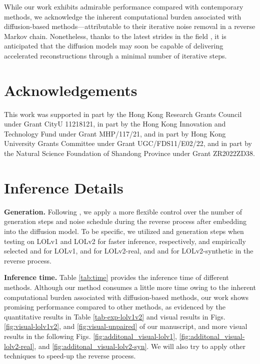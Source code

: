 \documentclass{article}
\begin{document}
While our work exhibits admirable performance compared with contemporary methods, we acknowledge the inherent computational burden associated with diffusion-based methods—attributable to their iterative noise removal in a reverse Markov chain.
Nonetheless, thanks to the latest strides in the field \cite{salimans2022progressive,song2023consistency}, it is anticipated that the diffusion models may soon be capable of delivering accelerated reconstructions through a minimal number of iterative steps.





\section*{Acknowledgements}
This work was supported in part by the Hong Kong Research Grants Council under Grant CityU 11218121, in part by the Hong Kong Innovation and Technology Fund under Grant MHP/117/21, and in part by Hong Kong University Grants Committee under Grant UGC/FDS11/E02/22, and in part by the Natural Science Foundation of Shandong Province under Grant ZR2022ZD38.

\small



\newpage

\appendix
\setcounter{table}{0}
\setcounter{figure}{0}
\renewcommand*{\thetable}{S\arabic{table}}
\renewcommand*{\thefigure}{S\arabic{figure}}

\section{Inference Details}

\textbf{Generation.}
Following \cite{saharia2022image}, we apply a more flexible control over the number of generation steps and noise schedule during the reverse process after embedding  into the diffusion model.
To be specific, we utilized  and  generation steps when testing on LOLv1 and LOLv2 for faster inference, respectively, and empirically selected  and  for LOLv1,  and  for LOLv2-real, and  and  for LOLv2-synthetic in the reverse process.

\textbf{Inference time.}
Table \ref{tab:time} provides the inference time of different methods. Although our method consumes a little more time owing to the inherent computational burden associated with diffusion-based methods, our work shows promising performance compared to other methods, as evidenced by the quantitative results in Table \ref{tab-exp-lolv1v2} and visual results in Figs. \ref{fig:visual-lolv1v2}, and \ref{fig:visual-unpaired} of our manuscript, and more visual results in the following Figs. \ref{fig:additonal_visual-lolv1}, \ref{fig:additonal_visual-lolv2-real}, and \ref{fig:additonal_visual-lolv2-syn}. We will also try to apply other techniques \cite{salimans2022progressive,song2023consistency} to speed-up the reverse process.
\end{document}
